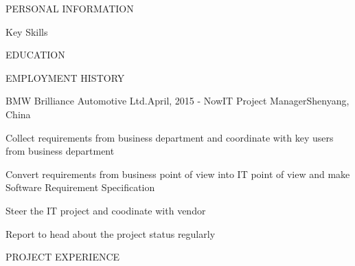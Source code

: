 \documentclass{myresume_en}
\begin{document}
\begin{rSection}{PERSONAL INFORMATION}
\end{rSection}

\begin{rSection}{Key Skills}
\end{rSection}

\begin{rSection}{EDUCATION}
\end{rSection}

\begin{rSection}{EMPLOYMENT HISTORY}
\begin{rExperience}{BMW Brilliance Automotive Ltd.}{April, 2015 - Now}{IT Project Manager}{Shenyang, China}
\item Collect requirements from business department and coordinate with key users from business department
\item Convert requirements from business point of view into IT point of view and make Software Requirement Specification
\item Steer the IT project and coodinate with vendor
\item Report to head about the project status regularly
\end{rExperience}

\end{rSection}
\begin{rSection}{PROJECT EXPERIENCE}
\end{rSection}
\end{document}
